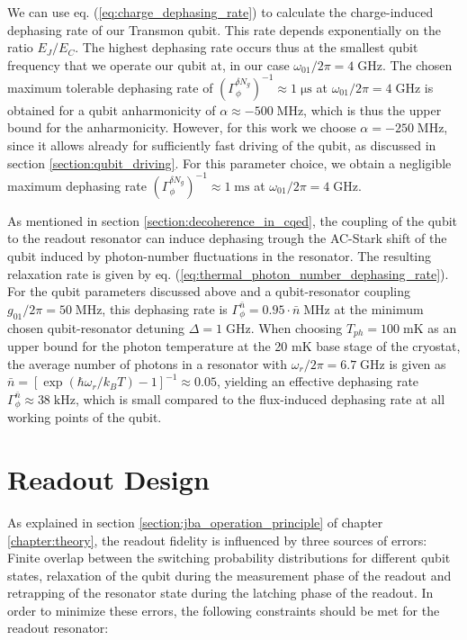 We can use eq. (\ref{eq:charge_dephasing_rate}) to calculate the charge-induced dephasing rate of our Transmon qubit. This rate depends exponentially on the ratio $E_J/E_C$. The highest dephasing rate occurs thus at the smallest qubit frequency that we operate our qubit at, in our case $\omega_{01}/2\pi=4\;\mathrm{GHz}$. The chosen maximum tolerable dephasing rate of $\left(\Gamma_{\phi}^{\delta N_g}\right)^{-1} \approx 1\;\mathrm{\mu s}$ at $\omega_{01}/2\pi=4\;\mathrm{GHz}$ is obtained for a qubit anharmonicity of $\alpha\approx-500\;\mathrm{MHz}$, which is thus the upper bound for the anharmonicity. However, for this work we choose $\alpha=-250\;\mathrm{MHz}$, since it allows already for sufficiently fast driving of the qubit, as discussed in section \ref{section:qubit_driving}. For this parameter choice, we obtain a negligible maximum dephasing rate $\left(\Gamma_{\phi}^{\delta N_g}\right)^{-1} \approx 1\;\mathrm{ms}$ at $\omega_{01}/2\pi=4\;\mathrm{GHz}$. 

\smallskip

As mentioned in section \ref{section:decoherence_in_cqed}, the coupling of the qubit to the readout resonator can induce dephasing trough the AC-Stark shift of the qubit induced by photon-number fluctuations in the resonator. The resulting relaxation rate is given by eq. (\ref{eq:thermal_photon_number_dephasing_rate}). For the qubit parameters discussed above and a qubit-resonator coupling $g_{01}/2\pi=50\;\mathrm{MHz}$, this dephasing rate is $\Gamma_\phi^{\bar{n}}= 0.95\cdot{\bar{n}} \;\mathrm{MHz}$ at the minimum chosen qubit-resonator detuning $\Delta = 1 \;\mathrm{GHz}$. When choosing $T_{ph}=100\;\mathrm{mK}$ as an upper bound for the photon temperature at the 20 mK base stage of the cryostat, the average number of photons in a resonator with $\omega_{r}/2\pi = 6.7\;\mathrm{GHz}$ is given as $\bar{n} = [\exp{(\hbar\omega_r/k_B T)-1}]^{-1} \approx 0.05$, yielding an effective dephasing rate $\Gamma_\phi^{\bar{n}}\approx 38\;\mathrm{kHz}$, which is small compared to the flux-induced dephasing rate at all working points of the qubit.

\section{Readout Design}

As explained in section \ref{section:jba_operation_principle} of chapter \ref{chapter:theory}, the readout fidelity is influenced by three sources of errors: Finite overlap between the switching probability distributions for different qubit states, relaxation of the qubit during the measurement phase of the readout and retrapping of the resonator state during the latching phase of the readout. In order to minimize these errors, the following constraints should be met for the readout resonator:


